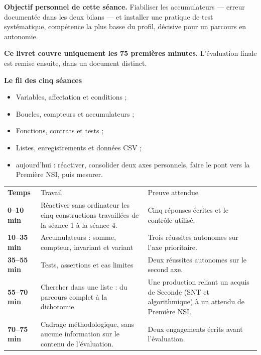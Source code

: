 \documentclass[10pt,a4paper]{article}
\begin{document}
\begin{goalbox}
\textbf{Objectif personnel de cette séance.} Fiabiliser les accumulateurs — erreur documentée dans les deux bilans — et installer une pratique de test systématique, compétence la plus basse du profil, décisive pour un parcours en autonomie.
\par\medskip
\textbf{Ce livret couvre uniquement les 75 premières minutes.} L'évaluation finale est remise ensuite, dans un document distinct.
\end{goalbox}
\begin{methodbox}
\textbf{Le fil des cinq séances}
\begin{itemize}[leftmargin=13mm,labelsep=3mm,itemsep=1.5pt]
\item[\textbf{\color{Navy}S1}] Variables, affectation et conditions ;
\item[\textbf{\color{Navy}S2}] Boucles, compteurs et accumulateurs ;
\item[\textbf{\color{Navy}S3}] Fonctions, contrats et tests ;
\item[\textbf{\color{Navy}S4}] Listes, enregistrements et données CSV ;
\item[\textbf{\color{Navy}S5}] aujourd'hui : réactiver, consolider deux axes personnels, faire le pont vers la Première NSI, puis mesurer.
\end{itemize}
\end{methodbox}
\par\noindent\begin{tabularx}{\linewidth}{>{\bfseries}p{20mm} X X}
\rowcolor{Navy}\color{white}Temps & \color{white}Travail & \color{white}Preuve attendue \\
0--10 min & Réactiver sans ordinateur les cinq constructions travaillées de la séance 1 à la séance 4. & Cinq réponses écrites et le contrôle utilisé. \\
10--35 min & Accumulateurs : somme, compteur, invariant et variant & Trois réussites autonomes sur l'axe prioritaire. \\
35--55 min & Tests, assertions et cas limites & Deux réussites autonomes sur le second axe. \\
55--70 min & Chercher dans une liste : du parcours complet à la dichotomie & Une production reliant un acquis de Seconde (SNT et algorithmique) à un attendu de Première NSI. \\
70--75 min & Cadrage méthodologique, sans aucune information sur le contenu de l'évaluation. & Deux engagements écrits avant l'évaluation. \\
\end{tabularx}
\end{document}
